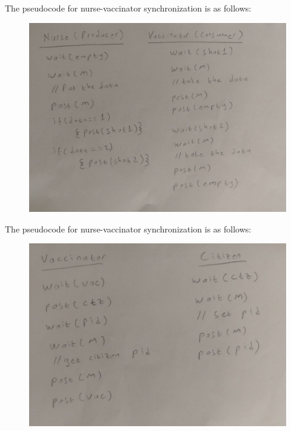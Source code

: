 \documentclass[10pt,english, openany]{book}
\begin{document}
The pseudocode for nurse-vaccinator synchronization is as follows:

\begin{figure}[htp]
    \centering
    \includegraphics[width=15cm]{nurse-vaccinator.jpg}
    
\end{figure}

\newpage

The pseudocode for nurse-vaccinator synchronization is as follows:

\begin{figure}[htp]
    \centering
    \includegraphics[width=15cm]{vaccinator-citizen.jpg}
    
\end{figure}
\end{document}
